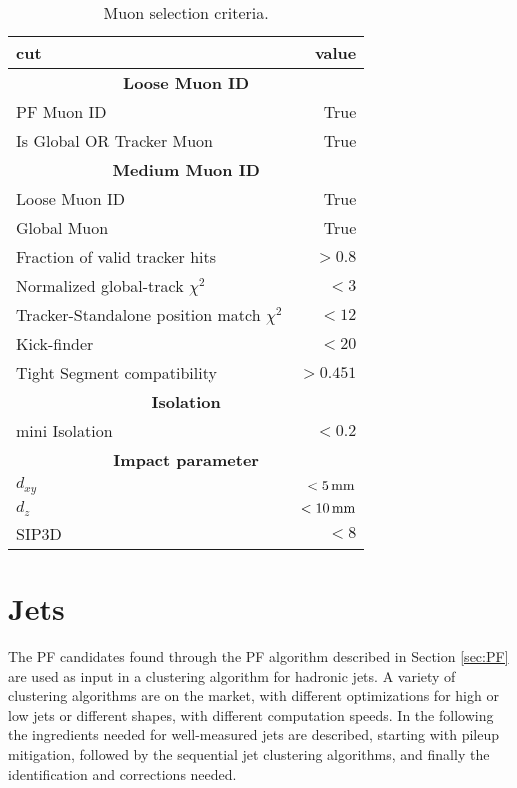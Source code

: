 \begin{table}[ht!]
\def\arraystretch{1.2}
    \caption{Muon selection criteria.}
    \label{tab:muonsID}
    \begin{center}
        \begin{tabular}{ l r}
        \hline \hline
        cut         &  value                             \\ \hline
        \multicolumn{2}{c}{\textbf{Loose Muon ID}}                \\
             PF Muon ID                        &  True \\
             Is Global OR Tracker Muon                        &  True \\
        \multicolumn{2}{c}{\textbf{Medium Muon ID}}                \\
             Loose Muon ID                        &  True \\
             Global Muon                         &  True \\
             Fraction of valid tracker hits      &  $>0.8$ \\
             Normalized global-track $\chi^{2}$     &  $<3$ \\
             Tracker-Standalone position match $\chi^{2}$   &  $<12$ \\
             Kick-finder    &   $<20$\\
             Tight Segment compatibility  & $>0.451$\\
        \multicolumn{2}{c}{\textbf{Isolation}}                \\
             mini Isolation                 &   $<0.2$                         \\
        \multicolumn{2}{c}{\textbf{Impact parameter}}                \\
        $d_{xy}$ & $<5\,\text{mm}$ \\
        $d_{z} $ & $<10\,\text{mm}$ \\
        SIP3D    & $< 8$ \\
\hline\hline
\end{tabular}
\end{center}
\end{table}                                                                                                      

\section{Jets}\label{sec:objectsJets}
\noindent\justify
The PF candidates found through the PF algorithm described in Section \ref{sec:PF} are used as input in a clustering algorithm for hadronic jets. 
A variety of clustering algorithms are on the market, with different optimizations for high or low \pt jets or different shapes, with different computation speeds. 
In the following the ingredients needed for well-measured jets are described, starting with pileup mitigation, followed by the sequential jet clustering algorithms, and finally the identification and corrections needed. 
